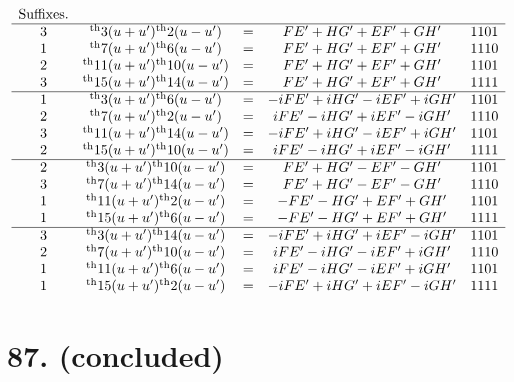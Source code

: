 \documentclass[11pt,a4paper]{book}
\providecommand{\uth}{\textsuperscript{th}}
\begin{document}
\[
\begin{array}{ccccc}
\text{Suffixes.} & & & & \\
\hline
3 & \uth{3}(u+u')\uth{2}(u-u') &=& FE' + HG' + EF' + GH' & 1101 \\
1 & \uth{7}(u+u')\uth{6}(u-u') &=& FE' + HG' + EF' + GH' & 1110 \\
2 & \uth{11}(u+u')\uth{10}(u-u') &=& FE' + HG' + EF' + GH' & 1101 \\
3 & \uth{15}(u+u')\uth{14}(u-u') &=& FE' + HG' + EF' + GH' & 1111 \\
\hline
1 & \uth{3}(u+u')\uth{6}(u-u') &=& -iFE' + iHG' - iEF' + iGH' & 1101 \\
2 & \uth{7}(u+u')\uth{2}(u-u') &=& iFE' - iHG' + iEF' - iGH' & 1110 \\
3 & \uth{11}(u+u')\uth{14}(u-u') &=& -iFE' + iHG' - iEF' + iGH' & 1101 \\
2 & \uth{15}(u+u')\uth{10}(u-u') &=& iFE' - iHG' + iEF' - iGH' & 1111 \\
\hline
2 & \uth{3}(u+u')\uth{10}(u-u') &=& FE' + HG' - EF' - GH' & 1101 \\
3 & \uth{7}(u+u')\uth{14}(u-u') &=& FE' + HG' - EF' - GH' & 1110 \\
1 & \uth{11}(u+u')\uth{2}(u-u') &=& -FE' - HG' + EF' + GH' & 1101 \\
1 & \uth{15}(u+u')\uth{6}(u-u') &=& -FE' - HG' + EF' + GH' & 1111 \\
\hline
3 & \uth{3}(u+u')\uth{14}(u-u') &=& -iFE' + iHG' + iEF' - iGH' & 1101 \\
2 & \uth{7}(u+u')\uth{10}(u-u') &=& iFE' - iHG' - iEF' + iGH' & 1110 \\
1 & \uth{11}(u+u')\uth{6}(u-u') &=& iFE' - iHG' - iEF' + iGH' & 1101 \\
1 & \uth{15}(u+u')\uth{2}(u-u') &=& -iFE' + iHG' + iEF' - iGH' & 1111
\end{array}
\]

\newpage
\section*{87. (concluded)}
\label{sec:87conc}
\end{document}
